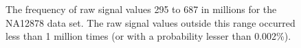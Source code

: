 \begin{figure}
	\centering

	\caption{\label{fig:data-hist}The frequency of raw signal values 295 to 687 in millions for the NA12878 data set. The raw signal values outside this range occurred less than 1 million times (or with a probability lesser than 0.002\%).}
\end{figure}

